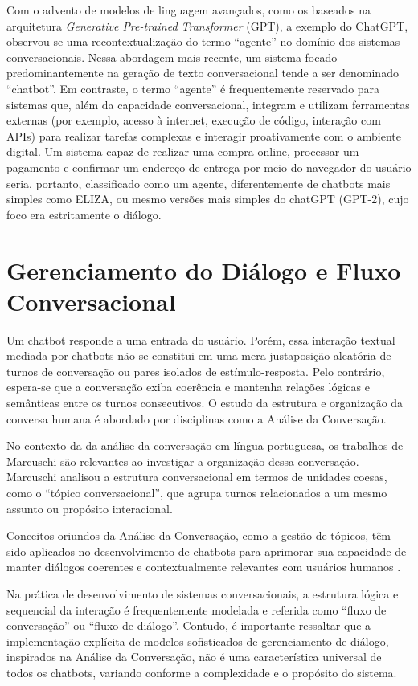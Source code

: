 \documentclass[14pt,a4paper,oneside]{book}
\begin{document}
Com o advento de modelos de linguagem avançados, como os baseados na arquitetura \textit{Generative Pre-trained Transformer} (GPT), a exemplo do ChatGPT, observou-se uma recontextualização do termo ``agente'' no domínio dos sistemas conversacionais. Nessa abordagem mais recente, um sistema focado predominantemente na geração de texto conversacional tende a ser denominado ``chatbot''. 
Em contraste, o termo ``agente'' é frequentemente reservado para sistemas que, além da capacidade conversacional, integram e utilizam ferramentas externas (por exemplo, acesso à internet, execução de código, interação com APIs) para realizar tarefas complexas e interagir proativamente com o ambiente digital. 
Um sistema capaz de realizar uma compra online, processar um pagamento e confirmar um endereço de entrega por meio do navegador do usuário seria, portanto, classificado como um agente, diferentemente de chatbots mais simples como ELIZA, ou mesmo versões mais simples do chatGPT (GPT-2), cujo foco era estritamente o diálogo.


\section{Gerenciamento do Diálogo e Fluxo Conversacional}

Um chatbot responde a uma entrada do usuário. Porém, essa interação textual mediada por chatbots não se constitui em uma mera justaposição aleatória de turnos de conversação ou pares isolados de estímulo-resposta. Pelo contrário, espera-se que a conversação exiba coerência e mantenha relações lógicas e semânticas entre os turnos consecutivos. O estudo da estrutura e organização da conversa humana é abordado por disciplinas como a Análise da Conversação.

No contexto da da análise da conversação em língua portuguesa, os trabalhos de Marcuschi \cite{Marchuschi1986} são relevantes ao investigar a organização dessa conversação. Marcuschi analisou a estrutura conversacional em termos de unidades coesas, como o ``tópico conversacional'', que agrupa turnos relacionados a um mesmo assunto ou propósito interacional.

Conceitos oriundos da Análise da Conversação, como a gestão de tópicos, têm sido aplicados no desenvolvimento de chatbots para aprimorar sua capacidade de manter diálogos coerentes e contextualmente relevantes com usuários humanos \cite{Neves2005}.

Na prática de desenvolvimento de sistemas conversacionais, a estrutura lógica e sequencial da interação é frequentemente modelada e referida como ``fluxo de conversação'' ou ``fluxo de diálogo''. Contudo, é importante ressaltar que a implementação explícita de modelos sofisticados de gerenciamento de diálogo, inspirados na Análise da Conversação, não é uma característica universal de todos os chatbots, variando conforme a complexidade e o propósito do sistema. 
\end{document}
